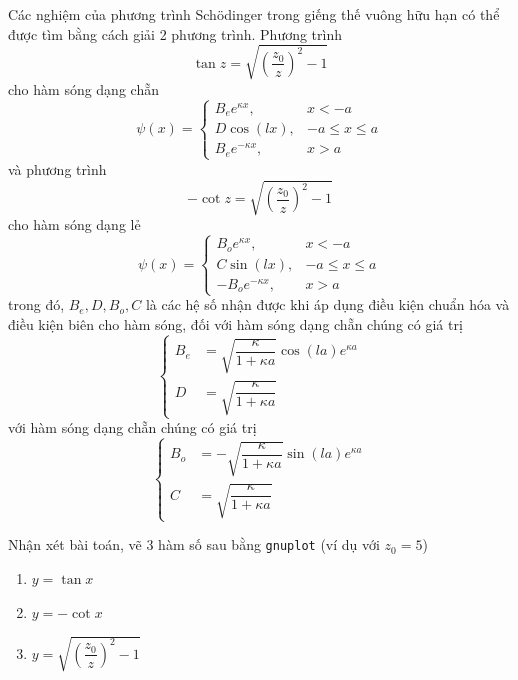 \documentclass{article}
\begin{document}
Các nghiệm của phương trình Schödinger trong giếng thế vuông hữu hạn có thể được tìm bằng cách giải 2 phương trình. Phương trình
\begin{equation}
    \tan z = \sqrt{\left(\frac{z_0}{z}\right)^2 - 1}
\end{equation}
cho hàm sóng dạng chẵn
\begin{equation}
    \psi(x) = 
    \begin{cases}
      B_e e^{\kappa x}, & x < -a \\
      D \cos(lx), & -a \le x \le a \\
      B_e e^{-\kappa x}, & x > a
    \end{cases}
\end{equation}
và phương trình
\begin{equation}
    -\cot z = \sqrt{\left(\frac{z_0}{z}\right)^2-1}
\end{equation}
cho hàm sóng dạng lẻ
\begin{equation}
    \psi(x) = 
    \begin{cases}
      B_o e^{\kappa x}, & x < -a \\
      C \sin(lx), & -a \le x \le a \\
      -B_o e^{-\kappa x}, & x > a
    \end{cases}
\end{equation}
trong đó, \(B_e, D, B_o, C\) là các hệ số nhận được khi áp dụng điều kiện chuẩn hóa và điều kiện biên cho hàm sóng, đối với hàm sóng dạng chẵn chúng có giá trị
\begin{equation}
    \begin{cases}
      B_e &= \sqrt{\dfrac{\kappa}{1 + \kappa a}} \cos(la) e^{\kappa a} \\
      D &= \sqrt{\dfrac{\kappa}{1 + \kappa a}}
    \end{cases}
\end{equation}
với hàm sóng dạng chẵn chúng có giá trị
\begin{equation}
    \begin{cases}
      B_o &= -\sqrt{\dfrac{\kappa}{1 + \kappa a}} \sin(la) e^{\kappa a} \\
      C &= \sqrt{\dfrac{\kappa}{1 + \kappa a}}
    \end{cases}
\end{equation}

Nhận xét bài toán, vẽ 3 hàm số sau bằng \texttt{gnuplot} (ví dụ với \(z_0 = 5\))
\begin{enumerate}
\item \(y = \tan x\)
\item \(y = -\cot x\)
\item \(y = \sqrt{\left(\dfrac{z_0}{z}\right)^2 - 1}\)
\end{enumerate}
\end{document}
